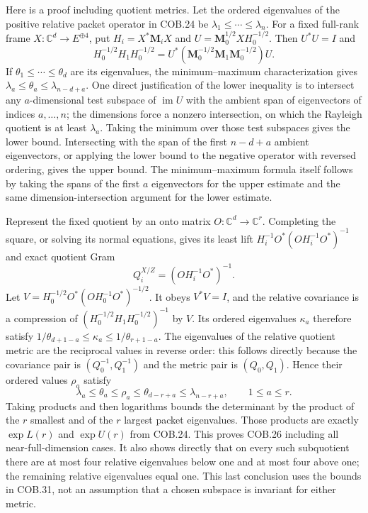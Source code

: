 Here is a proof including quotient metrics.  Let the ordered
eigenvalues of the positive relative packet operator in COB.24 be
$\lambda_1\le\cdots\le\lambda_n$.  For a fixed full-rank frame
$X:\mathbb C^d\to E^{\oplus4}$, put
$H_i=X^*\mathbf M_iX$ and
$U=\mathbf M_0^{1/2}XH_0^{-1/2}$.  Then $U^*U=I$ and
\[
 H_0^{-1/2}H_1H_0^{-1/2}
   =U^*(\mathbf M_0^{-1/2}\mathbf M_1\mathbf M_0^{-1/2})U.
 \tag{COB.29}
\]
If $\theta_1\le\cdots\le\theta_d$ are its eigenvalues, the
minimum--maximum characterization gives
$\lambda_a\le\theta_a\le\lambda_{n-d+a}$.
One direct justification of the lower inequality is to intersect
any $a$-dimensional test subspace of $\operatorname{im}U$ with
the ambient span of eigenvectors of indices $a,\ldots,n$;
the dimensions force a nonzero intersection, on which the Rayleigh
quotient is at least $\lambda_a$.  Taking the minimum over those
test subspaces gives the lower bound.  Intersecting with the span
of the first $n-d+a$ ambient eigenvectors, or applying the lower
bound to the negative operator with reversed ordering, gives the
upper bound.  The minimum--maximum formula itself follows by taking
the spans of the first $a$ eigenvectors for the upper estimate and
the same dimension-intersection argument for the lower estimate.

Represent the fixed quotient by an onto matrix
$O:\mathbb C^d\to\mathbb C^r$.  Completing the square, or solving
its normal equations, gives its least lift
$H_i^{-1}O^*(OH_i^{-1}O^*)^{-1}$ and exact quotient Gram
\[
 Q_i^{X/Z}=(OH_i^{-1}O^*)^{-1}.
 \tag{COB.30}
\]
Let $V=H_0^{-1/2}O^*(OH_0^{-1}O^*)^{-1/2}$.  It obeys
$V^*V=I$, and the relative covariance is a compression of
$(H_0^{-1/2}H_1H_0^{-1/2})^{-1}$ by $V$.
Its ordered eigenvalues $\kappa_a$ therefore satisfy
$1/\theta_{d+1-a}\le\kappa_a\le1/\theta_{r+1-a}$.
The eigenvalues of the relative quotient metric are the reciprocal
values in reverse order: this follows directly because the
covariance pair is $(Q_0^{-1},Q_1^{-1})$ and the metric pair is
$(Q_0,Q_1)$.  Hence their ordered values $\rho_a$ satisfy
\[
 \lambda_a\le\theta_a\le\rho_a
       \le\theta_{d-r+a}\le\lambda_{n-r+a},\qquad1\le a\le r.
 \tag{COB.31}
\]
Taking products and then logarithms bounds the determinant by the
product of the $r$ smallest and of the $r$ largest packet eigenvalues.
Those products are exactly $\exp L(r)$ and $\exp U(r)$ from COB.24.
This proves COB.26 including all near-full-dimension cases.  It also
shows directly that on every such subquotient there are at most four
relative eigenvalues below one and at most four above one; the
remaining relative eigenvalues equal one.  This last conclusion
uses the bounds in COB.31, not an assumption that a chosen subspace
is invariant for either metric.

